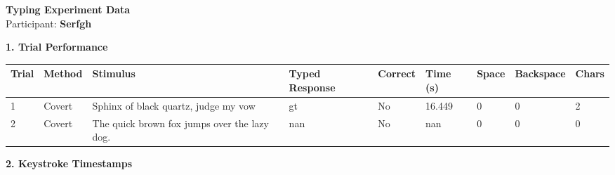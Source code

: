 \documentclass[10pt,a4paper]{article}
\begin{document}

\begin{center}
    {\Large\bfseries Typing Experiment Data}\\
    \vspace{2pt}
    Participant: \textbf{Serfgh}
\end{center}

\vspace{0.25cm}


\noindent
{\large\bfseries 1. Trial Performance}

\vspace{0.08cm}

\begin{center}
\begin{tabularx}{\textwidth}{
    C{0.45in}
    C{0.65in}
    L{2.35in}
    L{2.55in}
    C{0.65in}
    C{0.65in}
    C{0.55in}
    C{0.75in}
    C{0.55in}
}
\toprule

\textbf{Trial} &
\textbf{Method} &
\textbf{Stimulus} &
\textbf{Typed Response} &
\textbf{Correct} &
\textbf{Time (s)} &
\textbf{Space} &
\textbf{Backspace} &
\textbf{Chars}
\\

\midrule

1 &
Covert &
Sphinx of black quartz, judge my vow &
gt &
No &
16.449 &
0 &
0 &
2
\\

2 &
Covert &
The quick brown fox jumps over the lazy dog. &
nan &
No &
nan &
0 &
0 &
0
\\

\bottomrule
\end{tabularx}
\end{center}

\vspace{0.35cm}


\noindent
{\large\bfseries 2. Keystroke Timestamps}

\vspace{0.08cm}
\end{document}
